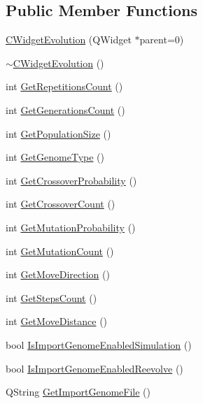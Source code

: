 \subsection*{Public Member Functions}
\begin{DoxyCompactItemize}
\item 
\hyperlink{classCWidgetEvolution_acc38dd902ec3ce3f9841e421d8df67e3}{CWidgetEvolution} (QWidget $\ast$parent=0)
\item 
\hyperlink{classCWidgetEvolution_a367c1cdbb1c2ca9a07bc849aefb72dde}{$\sim$CWidgetEvolution} ()
\item 
int \hyperlink{classCWidgetEvolution_ab932d951a5043baf812f8d8b7ba09681}{GetRepetitionsCount} ()
\item 
int \hyperlink{classCWidgetEvolution_a011bcc0709b3086df95eec9129919fe4}{GetGenerationsCount} ()
\item 
int \hyperlink{classCWidgetEvolution_a73c50aad4c50e16931ffe9e82e8c1ddd}{GetPopulationSize} ()
\item 
int \hyperlink{classCWidgetEvolution_a6fbf46c23f78d22d382e6ae0b02d97bd}{GetGenomeType} ()
\item 
int \hyperlink{classCWidgetEvolution_aa56437520abf70bfabc084ff03a6741b}{GetCrossoverProbability} ()
\item 
int \hyperlink{classCWidgetEvolution_a2e12780109a568cf644e39eb3a197dc8}{GetCrossoverCount} ()
\item 
int \hyperlink{classCWidgetEvolution_a5880bb761b37c1cdf3e9bed2def2a88b}{GetMutationProbability} ()
\item 
int \hyperlink{classCWidgetEvolution_a678de75bb460f47bd264e8f7204239dc}{GetMutationCount} ()
\item 
int \hyperlink{classCWidgetEvolution_a93068c5f3e07a982485cd7a12647905f}{GetMoveDirection} ()
\item 
int \hyperlink{classCWidgetEvolution_a311003fd6ff969e460b56c994e3ba3f5}{GetStepsCount} ()
\item 
int \hyperlink{classCWidgetEvolution_abc656941aa35fbed538c057939bd6126}{GetMoveDistance} ()
\item 
bool \hyperlink{classCWidgetEvolution_a57efe43b895556eedf5fc55cf1bf6e88}{IsImportGenomeEnabledSimulation} ()
\item 
bool \hyperlink{classCWidgetEvolution_a8d75d5c02040eb4946081468f50f09d5}{IsImportGenomeEnabledReevolve} ()
\item 
QString \hyperlink{classCWidgetEvolution_a29e080891a238ae764150e625151d132}{GetImportGenomeFile} ()
\item 

\end{DoxyCompactItemize}
